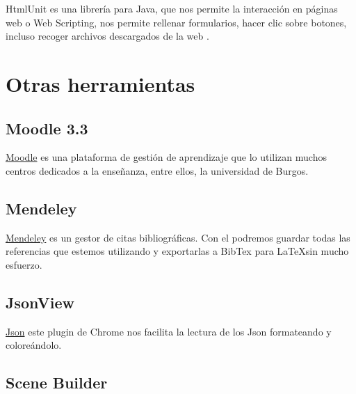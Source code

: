 HtmlUnit es una librería para Java, que nos permite la interacción en páginas web o Web Scripting, nos permite rellenar formularios, hacer clic sobre botones, incluso recoger archivos descargados de la web \cite{Java:htmlunit}.




\section{Otras herramientas}\label{otras-herramientas}

\subsection{Moodle 3.3}\label{moodle}

\href{https://moodle.org/?lang=es}{Moodle} es una plataforma de gestión de aprendizaje que lo utilizan muchos centros dedicados a la enseñanza, entre ellos, la universidad de Burgos. 

\subsection{Mendeley}\label{mendeley}

\href{https://www.mendeley.com/}{Mendeley} es un gestor de citas bibliográficas. Con el podremos guardar todas las referencias que estemos utilizando y exportarlas a BibTex para \LaTeX sin mucho esfuerzo.

\subsection{JsonView}\label{jsonview}

\href{https://chrome.google.com/webstore/detail/jsonview/chklaanhfefbnpoihckbnefhakgolnmc}{Json} este plugin de Chrome nos facilita la lectura de los Json formateando y coloreándolo.

\subsection{Scene Builder}\label{scene-builder}

